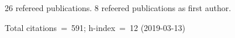 26 refereed publications. 8 refeered publications as first author.

Total citations~=~591; h-index~=~12 (2019-03-13)